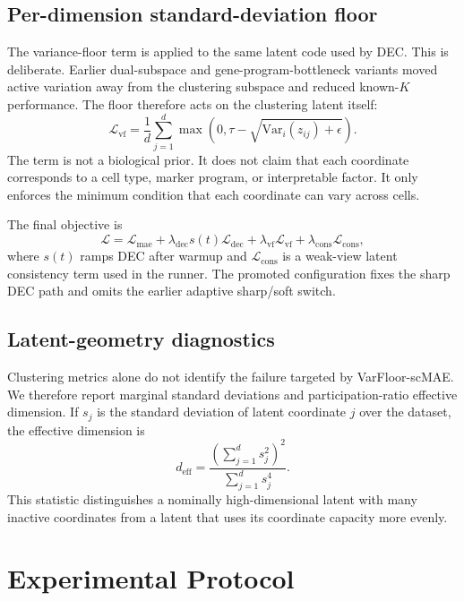 \documentclass[11pt]{article}
\begin{document}
\subsection{Per-dimension standard-deviation floor}

The variance-floor term is applied to the same latent code used by DEC. This is deliberate. Earlier dual-subspace and gene-program-bottleneck variants moved active variation away from the clustering subspace and reduced known-$K$ performance. The floor therefore acts on the clustering latent itself:
\begin{equation}
\mathcal{L}_{\mathrm{vf}}
= \frac{1}{d}\sum_{j=1}^{d}\max(0,\tau-\sqrt{\mathrm{Var}_{i}(z_{ij})+\epsilon}).
\end{equation}
The term is not a biological prior. It does not claim that each coordinate corresponds to a cell type, marker program, or interpretable factor. It only enforces the minimum condition that each coordinate can vary across cells.

The final objective is
\begin{equation}
\mathcal{L}
= \mathcal{L}_{\mathrm{mae}}
+ \lambda_{\mathrm{dec}}s(t)\mathcal{L}_{\mathrm{dec}}
+ \lambda_{\mathrm{vf}}\mathcal{L}_{\mathrm{vf}}
+ \lambda_{\mathrm{cons}}\mathcal{L}_{\mathrm{cons}},
\end{equation}
where $s(t)$ ramps DEC after warmup and $\mathcal{L}_{\mathrm{cons}}$ is a weak-view latent consistency term used in the runner. The promoted configuration fixes the sharp DEC path and omits the earlier adaptive sharp/soft switch.

\subsection{Latent-geometry diagnostics}

Clustering metrics alone do not identify the failure targeted by VarFloor-scMAE. We therefore report marginal standard deviations and participation-ratio effective dimension. If $s_j$ is the standard deviation of latent coordinate $j$ over the dataset, the effective dimension is
\begin{equation}
d_{\mathrm{eff}}
= \frac{(\sum_{j=1}^{d}s_j^2)^2}
{\sum_{j=1}^{d}s_j^4}.
\end{equation}
This statistic distinguishes a nominally high-dimensional latent with many inactive coordinates from a latent that uses its coordinate capacity more evenly.

\section{Experimental Protocol}
\end{document}
